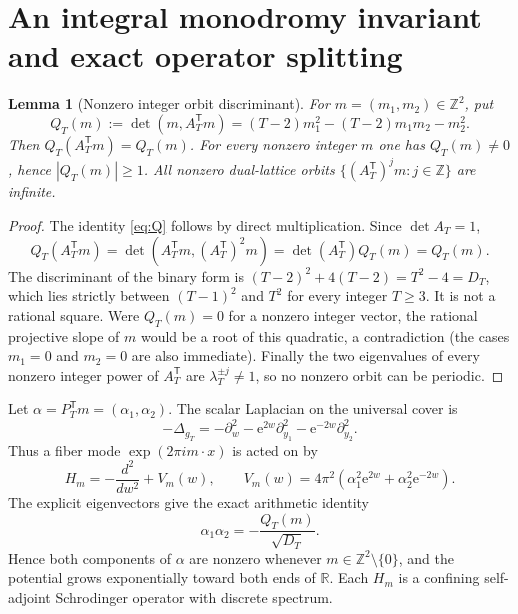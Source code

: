 \documentclass[11pt,a4paper]{article}
\newtheorem{lemma}{Lemma}
\newcommand{\Z}{\mathbb Z}
\newcommand{\R}{\mathbb R}
\newcommand{\Dlt}{\Delta}
\newcommand{\e}{\mathrm e}
\begin{document}
\section{An integral monodromy invariant and exact operator splitting}
\begin{lemma}[Nonzero integer orbit discriminant]\label{lem:q}
For $m=(m_1,m_2)\in\Z^2$, put
\begin{equation}\label{eq:Q}
Q_T(m):=\det(m,A_T^{\mathsf T}m)
=(T-2)m_1^2-(T-2)m_1m_2-m_2^2 .
\end{equation}
Then $Q_T(A_T^{\mathsf T}m)=Q_T(m)$.
For every nonzero integer $m$ one has $Q_T(m)\ne0$, hence
$|Q_T(m)|\ge1$. All nonzero dual-lattice orbits
$\{(A_T^{\mathsf T})^jm:j\in\Z\}$ are infinite.
\end{lemma}
\begin{proof}
The identity \eqref{eq:Q} follows by direct multiplication.
Since $\det A_T=1$,
\[
Q_T(A_T^{\mathsf T}m)
=\det(A_T^{\mathsf T}m,(A_T^{\mathsf T})^2m)
=\det(A_T^{\mathsf T})Q_T(m)=Q_T(m).
\]
The discriminant of the binary form is
$(T-2)^2+4(T-2)=T^2-4=D_T$, which lies strictly
between $(T-1)^2$ and $T^2$ for every integer $T\ge3$.
It is not a rational square. Were $Q_T(m)=0$
for a nonzero integer vector, the rational projective slope
of $m$ would be a root of this quadratic, a contradiction
(the cases $m_1=0$ and $m_2=0$ are also immediate).
Finally the two eigenvalues of every nonzero integer power of
$A_T^{\mathsf T}$ are $\lambda_T^{\pm j}\ne1$,
so no nonzero orbit can be periodic.
\end{proof}

Let $\alpha=P_T^{\mathsf T}m=(\alpha_1,\alpha_2)$.
The scalar Laplacian on the universal cover is
\[
-\Dlt_{g_T}=-\partial_w^2
-\e^{2w}\partial_{y_1}^2-\e^{-2w}\partial_{y_2}^2.
\]
Thus a fiber mode $\exp(2\pi i m\cdot x)$ is acted on by
\begin{equation}\label{eq:schrod}
H_m=-\frac{d^2}{dw^2}+V_m(w),\qquad
V_m(w)=4\pi^2\left(\alpha_1^2\e^{2w}
+\alpha_2^2\e^{-2w}\right).
\end{equation}
The explicit eigenvectors give the exact arithmetic identity
\begin{equation}\label{eq:product}
\alpha_1\alpha_2
=-\frac{Q_T(m)}{\sqrt{D_T}}.
\end{equation}
Hence both components of $\alpha$ are nonzero whenever
$m\in\Z^2\setminus\{0\}$, and the potential grows
exponentially toward both ends of $\R$. Each $H_m$ is a
confining self-adjoint Schrodinger operator with discrete spectrum.
\end{document}
